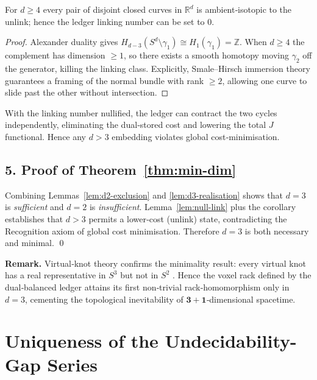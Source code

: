 \begin{lemma}
\label{lem:null-link}
For $d\ge4$ every pair of disjoint closed curves in $\mathbb R^{d}$ is
ambient‑isotopic to the unlink; hence the ledger linking number can be
set to $0$.
\end{lemma}

\begin{proof}
Alexander duality gives
$H_{d-3}(S^{d}\setminus\gamma_{1})\cong H_{1}(\gamma_{1})=\mathbb Z$.
When $d\ge4$ the complement has dimension $\ge1$, so there exists a
smooth homotopy moving $\gamma_{2}$ off the generator, killing the
linking class.  Explicitly, Smale–Hirsch immersion theory guarantees a
framing of the normal bundle with rank $\ge2$, allowing one curve to
slide past the other without intersection.
\end{proof}

\begin{corollary}
With the linking number nullified, the ledger can contract the two
cycles independently, eliminating the dual‑stored cost and lowering the
total $J$ functional.  Hence any $d>3$ embedding violates global
cost‑minimisation.
\end{corollary}

\subsection*{5.  Proof of Theorem~\ref{thm:min-dim}}

Combining Lemmas \ref{lem:d2-exclusion} and
\ref{lem:d3-realisation} shows that $d=3$ is \emph{sufficient} and
$d=2$ is \emph{insufficient}.  Lemma~\ref{lem:null-link} plus the
corollary establishes that $d>3$ permits a lower‑cost (unlink) state,
contradicting the Recognition axiom of global cost minimisation.
Therefore $d=3$ is both necessary and minimal. \qed

\bigskip
\noindent\textbf{Remark.}  
Virtual‑knot theory confirms the minimality result: every
virtual knot has a real representative in $S^{3}$ but not in $S^{2}$
\cite[Cor.\,2.7]{Kauffman2004}.  Hence the voxel rack defined by the
dual‑balanced ledger attains its first non‑trivial
rack‑homomorphism only in $d=3$,
cementing the topological inevitability of \(\mathbf{3+1}\)‑dimensional
spacetime.

\section{Uniqueness of the Undecidability-Gap Series}
\label{app:gap-uniqueness}

